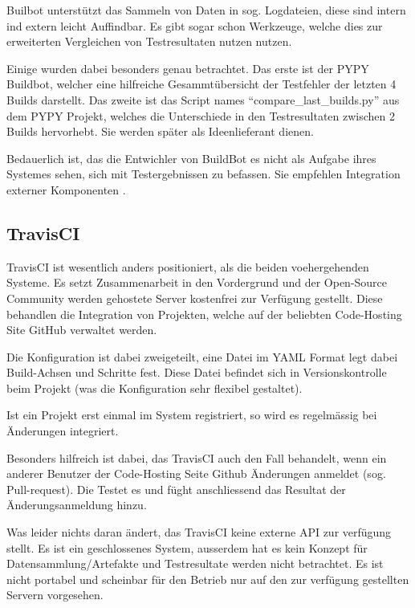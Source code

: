 Builbot unterst\"utzt das Sammeln von Daten in sog. Logdateien,
diese sind intern ind extern leicht Auffindbar.
Es gibt sogar schon Werkzeuge, welche dies zur erweiterten Vergleichen von Testresultaten nutzen nutzen.

Einige wurden dabei besonders genau betrachtet.
Das erste ist der PYPY Buildbot, welcher eine hilfreiche Gesammt\"ubersicht der Testfehler
der letzten 4 Builds darstellt.
Das zweite ist das Script names ``compare\_last\_builds.py'' aus dem PYPY Projekt,
welches die Unterschiede in den Testresultaten zwischen 2 Builds hervorhebt.
Sie werden sp\"ater als Ideenlieferant dienen.

Bedauerlich ist, das die Entwichler von BuildBot es nicht als Aufgabe ihres Systemes sehen,
sich mit Testergebnissen zu befassen.
Sie empfehlen Integration externer Komponenten \cite{buildbot:irc}.

\subsection{TravisCI}


TravisCI \cite{travisci:website} ist wesentlich anders positioniert, als die beiden voehergehenden Systeme.
Es setzt Zusammenarbeit in den Vordergrund und der Open-Source Community werden gehostete Server
kostenfrei zur Verf\"ugung gestellt.
Diese behandlen die Integration von Projekten,
welche auf der beliebten Code-Hosting Site GitHub verwaltet werden.

Die Konfiguration ist dabei zweigeteilt,
eine Datei im YAML Format legt dabei Build-Achsen und Schritte fest.
Diese Datei befindet sich in Versionskontrolle beim Projekt
(was die Konfiguration sehr flexibel gestaltet).

Ist ein Projekt erst einmal im System registriert,
so wird es regelm\"assig bei \"Anderungen integriert.

Besonders hilfreich ist dabei, das TravisCI auch den Fall behandelt,
wenn ein anderer Benutzer der Code-Hosting Seite Github \"Anderungen anmeldet
\cite{github:pullreq} (sog. Pull-request).
Die Testet es und f\"ught anschliessend das Resultat der \"Anderungsanmeldung hinzu.

Was leider nichts daran \"andert, das TravisCI keine externe API zur verf\"ugung stellt.
Es ist ein geschlossenes System, ausserdem hat es kein Konzept f\"ur Datensammlung/Artefakte
und Testresultate werden nicht betrachtet.
Es ist nicht portabel und scheinbar f\"ur den Betrieb nur
auf den zur verf\"ugung gestellten Servern vorgesehen.


